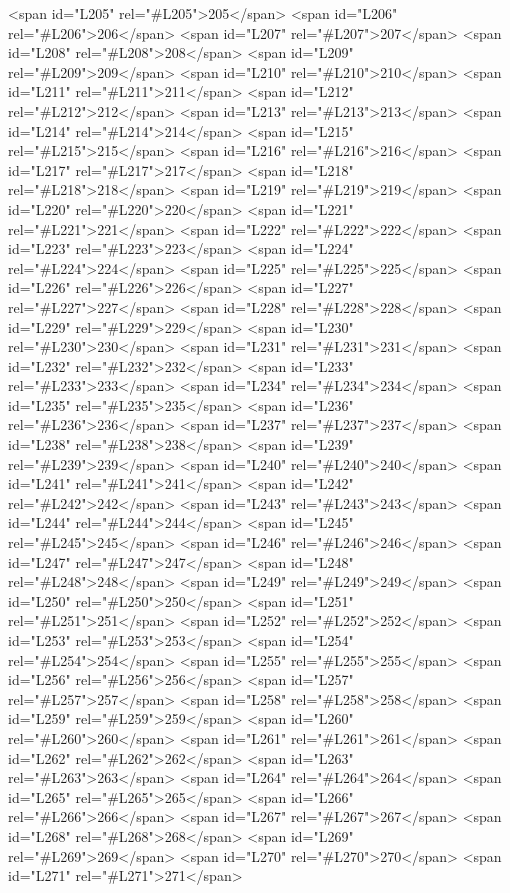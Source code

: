<span id="L205" rel="#L205">205</span>
<span id="L206" rel="#L206">206</span>
<span id="L207" rel="#L207">207</span>
<span id="L208" rel="#L208">208</span>
<span id="L209" rel="#L209">209</span>
<span id="L210" rel="#L210">210</span>
<span id="L211" rel="#L211">211</span>
<span id="L212" rel="#L212">212</span>
<span id="L213" rel="#L213">213</span>
<span id="L214" rel="#L214">214</span>
<span id="L215" rel="#L215">215</span>
<span id="L216" rel="#L216">216</span>
<span id="L217" rel="#L217">217</span>
<span id="L218" rel="#L218">218</span>
<span id="L219" rel="#L219">219</span>
<span id="L220" rel="#L220">220</span>
<span id="L221" rel="#L221">221</span>
<span id="L222" rel="#L222">222</span>
<span id="L223" rel="#L223">223</span>
<span id="L224" rel="#L224">224</span>
<span id="L225" rel="#L225">225</span>
<span id="L226" rel="#L226">226</span>
<span id="L227" rel="#L227">227</span>
<span id="L228" rel="#L228">228</span>
<span id="L229" rel="#L229">229</span>
<span id="L230" rel="#L230">230</span>
<span id="L231" rel="#L231">231</span>
<span id="L232" rel="#L232">232</span>
<span id="L233" rel="#L233">233</span>
<span id="L234" rel="#L234">234</span>
<span id="L235" rel="#L235">235</span>
<span id="L236" rel="#L236">236</span>
<span id="L237" rel="#L237">237</span>
<span id="L238" rel="#L238">238</span>
<span id="L239" rel="#L239">239</span>
<span id="L240" rel="#L240">240</span>
<span id="L241" rel="#L241">241</span>
<span id="L242" rel="#L242">242</span>
<span id="L243" rel="#L243">243</span>
<span id="L244" rel="#L244">244</span>
<span id="L245" rel="#L245">245</span>
<span id="L246" rel="#L246">246</span>
<span id="L247" rel="#L247">247</span>
<span id="L248" rel="#L248">248</span>
<span id="L249" rel="#L249">249</span>
<span id="L250" rel="#L250">250</span>
<span id="L251" rel="#L251">251</span>
<span id="L252" rel="#L252">252</span>
<span id="L253" rel="#L253">253</span>
<span id="L254" rel="#L254">254</span>
<span id="L255" rel="#L255">255</span>
<span id="L256" rel="#L256">256</span>
<span id="L257" rel="#L257">257</span>
<span id="L258" rel="#L258">258</span>
<span id="L259" rel="#L259">259</span>
<span id="L260" rel="#L260">260</span>
<span id="L261" rel="#L261">261</span>
<span id="L262" rel="#L262">262</span>
<span id="L263" rel="#L263">263</span>
<span id="L264" rel="#L264">264</span>
<span id="L265" rel="#L265">265</span>
<span id="L266" rel="#L266">266</span>
<span id="L267" rel="#L267">267</span>
<span id="L268" rel="#L268">268</span>
<span id="L269" rel="#L269">269</span>
<span id="L270" rel="#L270">270</span>
<span id="L271" rel="#L271">271</span>
